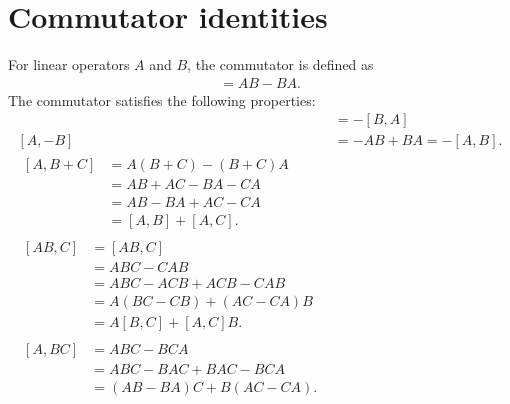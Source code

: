 \section{Commutator identities}
For linear operators $A$ and $B$, the commutator is defined as
\begin{align}
    [A,B] = AB - BA.
\end{align}
The commutator satisfies the following properties:
\begin{align}
    [A,B] &= -[B,A] \label{eq:BA} \\
    [A,-B] &= -AB + BA = -[A,B].\label{eq:AmB} \\
    \begin{split}        
    [A,B+C] 
        &= A(B+C) - (B+C)A \\
        &= AB + AC - BA - CA \\
        &= AB - BA + AC - CA \\
        &= [A,B] + [A,C]. \label{eq:ABpC}
    \end{split}\\
    \begin{split}    
    [AB,C] 
        &= [AB,C] \\
        &= ABC - CAB \\
        &= ABC - ACB + ACB - CAB \\
        &= A(BC-CB) + (AC-CA)B \\
        &= A[B,C] + [A,C]B.\label{eq:A2B}
    \end{split}\\
    \begin{split}    
    [A,BC]
        &= ABC - BCA \\
        &= ABC - BAC + BAC - BCA \\
        &= (AB - BA)C + B(AC - CA).\label{eq:ABC}
    \end{split}
\end{align}

